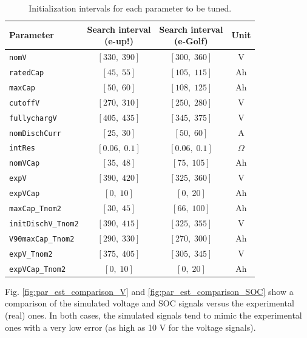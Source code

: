 \begin{table}[hbt!]
\centering
\begin{tabular}[t]{lccc}
\toprule
Parameter & \breakcell{Search interval\\(e-up!)} & \breakcell{Search interval\\(e-Golf)} & Unit\\
\midrule
\texttt{nomV} & $[330,\;390]$ & $[300,\;360]$ & V\\[0.1cm]
\texttt{ratedCap} & $[45,\;55]$ & $[105,\;115]$ & Ah\\[0.1cm]
\texttt{maxCap} & $[50,\;60]$ & $[108,\;125]$ & Ah\\[0.1cm]
\texttt{cutoffV} & $[270,\;310]$ & $[250,\;280]$ & V\\[0.1cm]
\texttt{fullychargV} & $[405,\;435]$ & $[345,\;375]$ & V\\[0.1cm]
\texttt{nomDischCurr} & $[25,\;30]$ & $[50,\;60]$ & A\\[0.1cm]
\texttt{intRes} & $[0.06,\;0.1]$ & $[0.06,\;0.1]$ & $\Omega$\\[0.1cm]
\texttt{nomVCap} & $[35,\;48]$ & $[75,\;105]$ & Ah\\[0.1cm]
\texttt{expV} & $[390,\;420]$ & $[325,\;360]$ & V\\[0.1cm]
\texttt{expVCap} & $[0,\;10]$ & $[0,\;20]$ & Ah\\[0.1cm]
\texttt{maxCap\_Tnom2} & $[30,\;45]$ & $[66,\;100]$ & Ah\\[0.1cm]
\texttt{initDischV\_Tnom2} & $[390,\;415]$ & $[325,\;355]$ & V\\[0.1cm]
\texttt{V90maxCap\_Tnom2} & $[290,\;330]$ & $[270,\;300]$ & Ah\\[0.15cm]
\texttt{expV\_Tnom2} & $[375,\;405]$ & $[305,\;345]$ & V\\[0.1cm]
\texttt{expVCap\_Tnom2} & $[0,\;10]$ & $[0,\;20]$ & Ah\\
\bottomrule
\end{tabular}
\caption[Initialization intervals for the parameter estimator]{Initialization intervals for each parameter to be tuned.}
\label{tab:par_est_search_intervals}
\end{table}

Fig. \ref{fig:par_est_comparison_V} and \ref{fig:par_est_comparison_SOC} show a comparison of the simulated voltage and SOC signals versus the experimental (real) ones. In both cases, the simulated signals tend to mimic the experimental ones with a very low error (as high as 10 V for the voltage signals).

